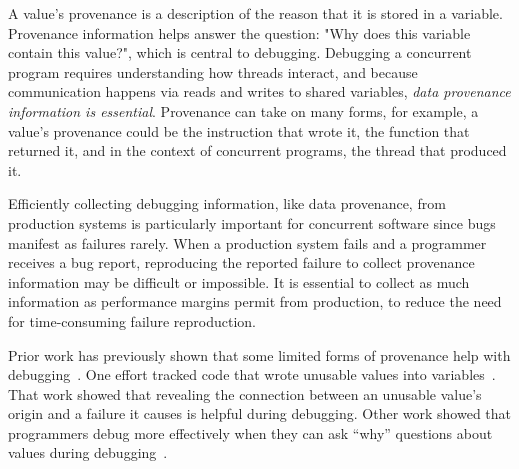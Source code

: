 \documentclass[preprint,9pt]{sigplanconf}
\begin{document}

A value's provenance is a description of the reason that it is stored in a
variable. Provenance information helps answer the question: "Why does this
variable contain this value?", which is central to debugging. Debugging a
concurrent program requires understanding how threads interact, and because  
communication happens via reads and writes to shared variables, {\em data
provenance information is essential}. Provenance can take on many forms, for
example, a value's provenance could be the instruction that wrote it, the
function that returned it, and in the context of concurrent programs, the
thread that produced it.


Efficiently collecting debugging information, like data provenance, from production
systems is particularly important for concurrent software since bugs
manifest as failures rarely. When a production system fails and a programmer
receives a bug report, reproducing the reported failure to collect provenance
information may be difficult or impossible. It is essential to collect as much
information as performance margins permit from production, to reduce the need
for time-consuming failure reproduction.

Prior work has previously shown that some limited forms of provenance help
with debugging~\cite{badapples, whylineicse, tipslicingsurvey}. One effort
tracked code that wrote unusable values into variables~\cite{badapples}. That
work showed that revealing the connection between an unusable value's origin
and a failure it causes is helpful during debugging. Other work showed that
programmers debug more effectively when they can ask ``why'' questions about
values during debugging~\cite{tipslicingsurvey,whylineicse}. 
\end{document}
